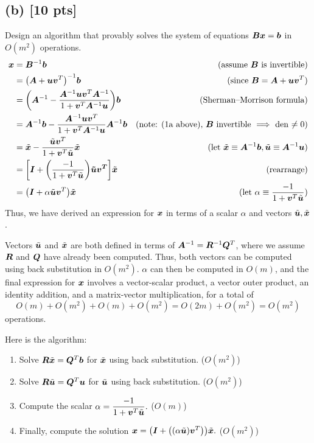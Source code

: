 \documentclass[twoside,10pt]{article}
\begin{document}
\subsection*{(b) [10 pts]} 
Design an algorithm that provably solves the system of equations $\bm{B} \bm{x} = \bm{b}$ in $O(m^2)$ operations. 
\begin{align*}
  \vct{x} &= \mtx{B}^{-1}\vct{b}&\text{(assume $\mtx{B}$ is invertible)}\\
  &= \left(\mtx{A} + \vct{u}\vct{v}^T\right)^{-1}\vct{b}&\text{(since $\mtx{B} = \mtx{A} + \vct{u}\vct{v}^T$)}\\
  &= \left(\mtx{A}^{-1} - \dfrac{\mtx{A}^{-1}\vct{u}\vct{v}^T\mtx{A}^{-1}}{1+\vct{v}^T\mtx{A}^{-1}\vct{u}}\right)\vct{b}&\text{(Sherman–Morrison formula)}\\
  &= \mtx{A}^{-1}\vct{b} - \dfrac{\mtx{A}^{-1}\vct{u}\vct{v}^T}{1+\vct{v}^T\mtx{A}^{-1}\vct{u}}\mtx{A}^{-1}\vct{b}&\text{(note: (1a above), $\mtx{B}$ invertible $\implies$ den $\neq 0$)}\\
  &= \tilde{\vct{x}} - \dfrac{\tilde{\vct{u}}\vct{v}^T}{1+\vct{v}^T\tilde{\vct{u}}}\tilde{\vct{x}}&\text{(let $\tilde{\vct{x}} \equiv \mtx{A}^{-1}\vct{b}, \tilde{\vct{u}} \equiv \mtx{A}^{-1}\vct{u}$)}\\
  &= \left[\vct{I} + \left(\dfrac{-1}{1+\vct{v}^T\tilde{\vct{u}}}\right)\vct{\tilde{\vct{u}}\vct{v}^T}\right]\tilde{\vct{x}}&\text{(rearrange)}\\
  &= \left(\vct{I} + \alpha\tilde{\vct{u}}\vct{v}^T\right)\tilde{\vct{x}}&\text{(let $\alpha \equiv \dfrac{-1}{1+\vct{v}^T\tilde{\vct{u}}}$)}
\end{align*}
\quad Thus, we have derived an expression for $\bm{x}$ in terms of a scalar $\alpha$ and vectors $\tilde{\bm{u}}, \tilde{\bm{x}}$.

\quad Vectors $\tilde{\bm{u}}$ and $\tilde{\bm{x}}$ are both defined in terms of $\bm{A}^{-1} = \bm{R}^{-1}\bm{Q}^T$, where we assume $\bm{R}$ and $\bm{Q}$ have already been computed.
Thus, both vectors can be computed using back substitution in $O(m^2)$.
$\alpha$ can then be computed in $O(m)$, and the final expression for $\bm{x}$ involves a vector-scalar product, a vector outer product, an identity addition, and a matrix-vector multiplication, for a total of
$$O(m) + O(m^2) + O(m) + O(m^2) = O(2m) + O(m^2) = O(m^2)$$
operations.

\quad Here is the algorithm:
\begin{enumerate}
  \item Solve $\bm{R}\tilde{\bm{x}} = \bm{Q}^T\bm{b}$ for $\tilde{\bm{x}}$ using back substitution. ($O(m^2)$)
  \item Solve $\bm{R}\tilde{\bm{u}} = \bm{Q}^T\bm{u}$ for $\tilde{\bm{u}}$ using back substitution. ($O(m^2)$)
  \item Compute the scalar $\alpha = \dfrac{-1}{1+\bm{v}^T\tilde{\bm{u}}}.$ ($O(m)$)
  \item Finally, compute the solution $\vct{x} = \left(\vct{I} + \left(\left(\alpha\tilde{\vct{u}}\right)\vct{v}^T\right)\right)\tilde{\vct{x}}.$ ($O(m^2)$)
\end{enumerate}
\end{document}
